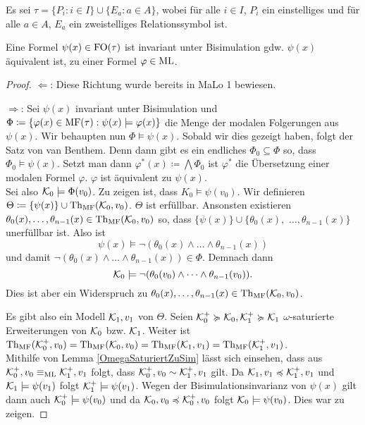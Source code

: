\begin{satz}
	Es sei $\tau=\{P_i:i\in I\}\cup\{E_a : a\in A\}$, wobei für alle $i\in I$, $P_i$ ein einstelliges und für alle $a\in A$, $E_a$ ein zweistelliges Relationssymbol ist.
	
	Eine Formel $\psi(x)\in \operatorname{FO}(\tau)$ ist invariant unter Bisimulation gdw. $\psi(x)$ äquivalent ist, zu einer Formel $\varphi\in \operatorname{ML}$.
\end{satz}
\begin{proof}
	$\Leftarrow$: Diese Richtung wurde bereits in MaLo 1 bewiesen.
	
	$\Rightarrow$: Sei $\psi(x)$ invariant unter Bisimulation und $\Phi\coloneqq\{\varphi(x) \in \operatorname{MF}(\tau) : \psi(x)\models\varphi(x)\}$ die Menge der modalen Folgerungen aus $\psi(x)$.
	Wir behaupten nun $\Phi\models \psi(x)$. Sobald wir dies gezeigt haben, folgt der Satz von van Benthem. Denn dann gibt es ein endliches $\Phi_0\subseteq\Phi$ so, dass $\Phi_0\models \psi(x)$. Setzt man dann $\varphi^\ast(x)\coloneqq\bigwedge\Phi_0$ ist $\varphi^\ast$ die Übersetzung einer modalen Formel $\varphi$. $\varphi$ ist äquivalent zu $\psi(x)$.
	\\
	Sei also $\mathcal{K}_0\models\Phi(v_0)$. Zu zeigen ist, dass $K_0\models\psi(v_0)$. Wir definieren $\Theta\coloneqq\{\psi(x)\}\cup \operatorname{Th}_{\operatorname{MF}}(\mathcal{K}_0,v_0)$.
	$\Theta$ ist erfüllbar. Ansonsten existieren $\theta_0(x),\dots,\theta_{n-1}(x)\in \operatorname{Th}_{\operatorname{MF}}(\mathcal{K}_0,v_0)$ so, 
	dass 
	$\{\psi(x)\} \cup \{\theta_0(x),$ $\dots, \theta_{n-1}(x)\}$ unerfüllbar ist. 
	Also ist 
	\[\psi(x)\models\neg(\theta_0(x)\land\dots\land\theta_{n-1}(x))\]
	und damit $\neg(\theta_0(x)\land\dots\land\theta_{n-1}(x))\in\Phi$. Demnach dann 
	\[\mathcal{K}_0\models\neg(\theta_0(v_0)\land\dots\land\theta_{n-1}(v_0)).\] 
	Dies ist aber ein Widerspruch zu $\theta_0(x),\dots,\theta_{n-1}(x)\in \operatorname{Th}_{\operatorname{MF}}(\mathcal{K}_0,v_0)$.
	
	Es gibt also ein Modell $\mathcal{K}_1,v_1$ von $\Theta$.
	Seien $\mathcal{K}_0^+\succcurlyeq\mathcal{K}_0,\mathcal{K}_1^+\succcurlyeq\mathcal{K}_1$ $\omega$-saturierte Erweiterungen von $\mathcal{K}_0$ bzw. $\mathcal{K}_1$. Weiter ist $\operatorname{Th}_{\operatorname{MF}}(\mathcal{K}_0^+,v_0)=\operatorname{Th}_{\operatorname{MF}}(\mathcal{K}_0,v_0)=\operatorname{Th}_{\operatorname{MF}}(\mathcal{K}_1,v_1)=\operatorname{Th}_{\operatorname{MF}}(\mathcal{K}_1^+,v_1)$.
	\\
	Mithilfe von Lemma \ref{OmegaSaturiertZuSim} lässt sich einsehen, dass aus $\mathcal{K}_0^+,v_0 \equiv_{\operatorname{ML}} \mathcal{K}_1^+,v_1$ folgt, dass $\mathcal{K}_0^+,v_0 \sim \mathcal{K}_1^+,v_1$ gilt.
	Da $\mathcal{K}_1,v_1\preccurlyeq \mathcal{K}_1^+,v_1$ und $\mathcal{K}_1\models\psi(v_1)$ folgt $\mathcal{K}_1^+\models\psi(v_1)$. Wegen der Bisimulationsinvarianz von $\psi(x)$ gilt dann auch $\mathcal{K}_0^+\models\psi(v_0)$ und da $\mathcal{K}_0,v_0\preccurlyeq\mathcal{K}_0^+,v_0$ folgt $\mathcal{K}_0\models\psi(v_0)$. Dies war zu zeigen.
\end{proof}

